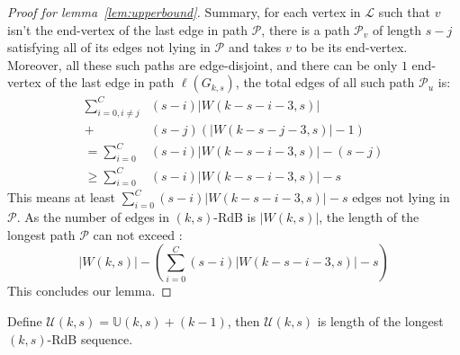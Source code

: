 \begin{proof}[Proof for lemma~\ref{lem:upperbound}]
    Summary, for each vertex in $\mathscr{L}$ such that $v$ isn't the end-vertex of the last edge in path $\mathscr{P}$, there is a path $\mathcal{P}_{v}$ of length $s-j$ satisfying all of its edges not lying in $\mathscr{P}$ and takes $v$ to be its end-vertex. Moreover, all these such paths are edge-disjoint, and there can be only $1$ end-vertex of the last edge in path $\ell(G_{k,s})$, the total edges of all such path $\mathcal{P}_{u}$ is:
    \begin{align*}
        \sum_{i=0,i\neq j}^{C} &(s-i)\lvert W(k-s-i-3,s) \rvert \\
        + &(s-j)(\lvert W(k-s-j-3,s)\rvert-1)\\
        = \sum_{i=0}^{C} &(s-i)\lvert W(k-s-i-3,s) \rvert - (s-j) \\
        \geq \sum_{i=0}^{C} &(s-i)\lvert W(k-s-i-3,s) \rvert -s  
    \end{align*}
    This means at least $\sum_{i=0}^{C} (s-i)\lvert W(k-s-i-3,s) \rvert -s$ edges not lying in $\mathscr{P}$. As the number of edges in $(k,s)$-RdB is $\lvert W(k,s)\rvert$, the length of the longest path $\mathscr{P}$ can not exceed : 
    \[\lvert W(k,s)\rvert - (\sum_{i=0}^{C} (s-i)\lvert W(k-s-i-3,s) \rvert- s)\]
    This concludes our lemma.
\end{proof}

Define $\mathcal{U}(k,s) = \mathbb{U}(k,s)+(k-1)$, then $\mathcal{U}(k,s)$ is length of the longest $(k,s)$-RdB sequence.